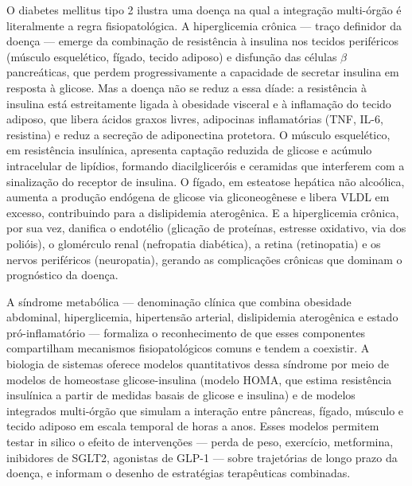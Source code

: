 O diabetes mellitus tipo 2 ilustra uma doença na qual a integração multi-órgão é literalmente a regra fisiopatológica. A hiperglicemia crônica --- traço definidor da doença --- emerge da combinação de resistência à insulina nos tecidos periféricos (músculo esquelético, fígado, tecido adiposo) e disfunção das células $\beta$ pancreáticas, que perdem progressivamente a capacidade de secretar insulina em resposta à glicose. Mas a doença não se reduz a essa díade: a resistência à insulina está estreitamente ligada à obesidade visceral e à inflamação do tecido adiposo, que libera ácidos graxos livres, adipocinas inflamatórias (TNF, IL-6, resistina) e reduz a secreção de adiponectina protetora. O músculo esquelético, em resistência insulínica, apresenta captação reduzida de glicose e acúmulo intracelular de lipídios, formando diacilgliceróis e ceramidas que interferem com a sinalização do receptor de insulina. O fígado, em esteatose hepática não alcoólica, aumenta a produção endógena de glicose via gliconeogênese e libera VLDL em excesso, contribuindo para a dislipidemia aterogênica. E a hiperglicemia crônica, por sua vez, danifica o endotélio (glicação de proteínas, estresse oxidativo, via dos polióis), o glomérculo renal (nefropatia diabética), a retina (retinopatia) e os nervos periféricos (neuropatia), gerando as complicações crônicas que dominam o prognóstico da doença.

A síndrome metabólica --- denominação clínica que combina obesidade abdominal, hiperglicemia, hipertensão arterial, dislipidemia aterogênica e estado pró-inflamatório --- formaliza o reconhecimento de que esses componentes compartilham mecanismos fisiopatológicos comuns e tendem a coexistir. A biologia de sistemas oferece modelos quantitativos dessa síndrome por meio de modelos de homeostase glicose-insulina (modelo HOMA, que estima resistência insulínica a partir de medidas basais de glicose e insulina) e de modelos integrados multi-órgão que simulam a interação entre pâncreas, fígado, músculo e tecido adiposo em escala temporal de horas a anos. Esses modelos permitem testar in silico o efeito de intervenções --- perda de peso, exercício, metformina, inibidores de SGLT2, agonistas de GLP-1 --- sobre trajetórias de longo prazo da doença, e informam o desenho de estratégias terapêuticas combinadas.

